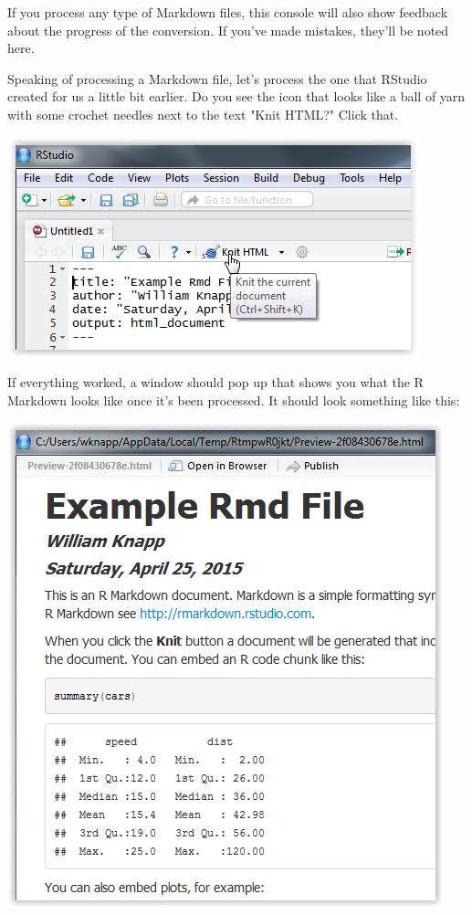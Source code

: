 \documentclass[12pt]{article}
\begin{document}
If you process any type of Markdown files, this console will also show feedback about
the progress of the conversion. If you've made mistakes, they'll be noted here.

Speaking of processing a Markdown file, let's process the one that RStudio created for
us a little bit earlier. Do you see the icon that looks like a ball of yarn with some
crochet needles next to the text "Knit HTML?" Click that.

\includegraphics{imgs/R07.PNG}

If everything worked, a window should pop up that shows you what the R Markdown looks
like once it's been processed. It should look something like this:

\includegraphics{imgs/R08.PNG}
\end{document}
